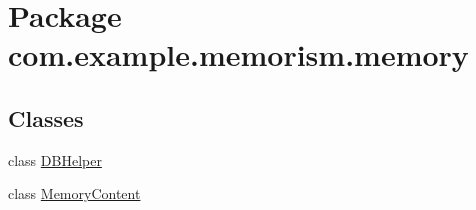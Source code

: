 \hypertarget{namespacecom_1_1example_1_1memorism_1_1memory}{}\section{Package com.\+example.\+memorism.\+memory}
\label{namespacecom_1_1example_1_1memorism_1_1memory}
\subsection*{Classes}
\begin{DoxyCompactItemize}
\item 
class \hyperlink{classcom_1_1example_1_1memorism_1_1memory_1_1_d_b_helper}{D\+B\+Helper}
\item 
class \hyperlink{classcom_1_1example_1_1memorism_1_1memory_1_1_memory_content}{Memory\+Content}
\end{DoxyCompactItemize}
